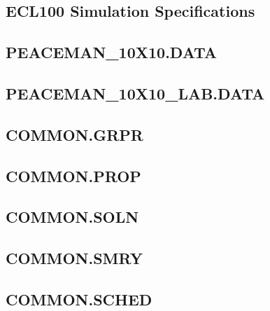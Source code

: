 
\subsection{ECL100 Simulation Specifications} %
\label{sub:ecl100_simulation_specifications}

\subsection{PEACEMAN\_10X10.DATA} %
\label{sub:peaceman_10x10_data}

\clearpage

\subsection{PEACEMAN\_10X10\_LAB.DATA} %
\label{sub:peaceman_10x10_lab_data}

\clearpage

\subsection{COMMON.GRPR} %
\label{sub:common_grpr}


\subsection{COMMON.PROP} %
\label{sub:common_prop}


\subsection{COMMON.SOLN} %
\label{sub:common_soln}


\subsection{COMMON.SMRY} %
\label{sub:common_smry}


\subsection{COMMON.SCHED} %
\label{sub:common_sched}


